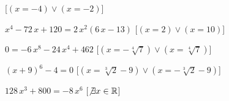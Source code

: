 \begin{esercizio}
\begin{enumeratea}
\hfill [\((x=-4)\vee (x=-2)\)]
\item \({x}^{4}-72\,x+120=2\,{x}^{2} \left( 6\,x-13 \right) \) 
\hfill [\((x=2)\vee (x=10)\)]
\item \(0=-6\,{x}^{8}-24\,{x}^{4}+462\) 
\hfill [\((x=-\sqrt [4]{7})\vee (x=\sqrt [4]{7})\)]
\item \( \left( x+9 \right) ^{6}-4=0\) 
\hfill [\((x=\sqrt [3]{2}-9)\vee (x=-\sqrt [3]{2}-9)\)]
\item \(128\,{x}^{3}+800=-8\,{x}^{6}\) 
\hfill [\(\not\exists x \in \mathbb{R}\)]
\end{enumeratea}
\end{esercizio}

